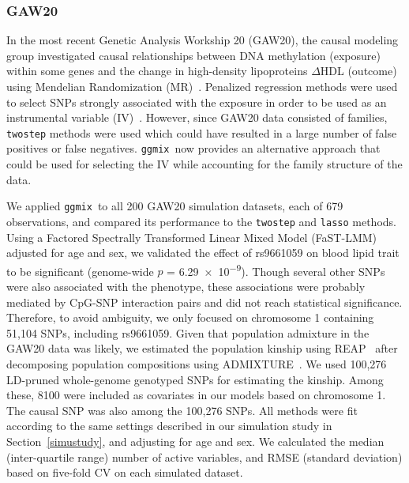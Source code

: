 \documentclass[12pt,letter]{article}\usepackage[]{graphicx}\usepackage[]{color}
\newcommand{\ggmix}{\texttt{ggmix}}
\begin{document}
\subsubsection{GAW20}

In the most recent Genetic Analysis Workship 20 (GAW20), the causal modeling group investigated causal relationships between DNA methylation (exposure) within some genes and the change in high-density lipoproteins $\Delta$HDL (outcome) using Mendelian Randomization (MR)~\citep{davey2003mendelian}.
Penalized regression methods were used to select SNPs strongly associated with the exposure in order to be used as an instrumental variable (IV)~\citep{cherlin2018using,zhou2018analysis}.
However, since GAW20 data consisted of families, \texttt{twostep} methods were used which could have resulted in a large number of false positives or false negatives. \ggmix~now provides an alternative approach that could be used for selecting the IV while accounting for the family structure of the data.

We applied \ggmix ~to all 200 GAW20 simulation datasets, each of 679 observations, and compared its performance to the \texttt{twostep} and \texttt{lasso} methods.
Using a Factored Spectrally Transformed Linear Mixed Model (FaST-LMM)~\citep{howey2018application} adjusted for age and sex, we validated the effect of rs9661059 on blood lipid trait to be significant (genome-wide $p$ = \num{6.29e-9}).
Though several other SNPs were also associated with the phenotype, these associations were probably mediated by CpG-SNP interaction pairs and did not reach statistical significance.
Therefore, to avoid ambiguity, we only focused on chromosome 1 containing 51,104 SNPs, including rs9661059.
Given that population admixture in the GAW20 data was likely, we estimated the population kinship using REAP~\citep{thornton2012estimating} after decomposing population compositions using ADMIXTURE~\citep{alexander2009fast}. We used 100,276 LD-pruned whole-genome genotyped SNPs for estimating the kinship. Among these, 8100 were included as covariates in our models based on chromosome 1. The causal SNP was also among the 100,276 SNPs. All methods were fit according to the same settings described in our simulation study in Section~\ref{simustudy}, and adjusting for age and sex. We calculated the median (inter-quartile range) number of active variables, and RMSE (standard deviation) based on five-fold CV on each simulated dataset.
\end{document}
